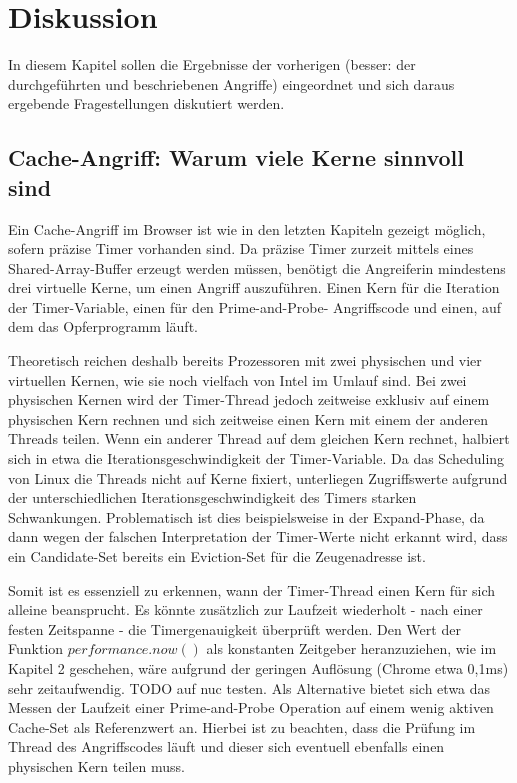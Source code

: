 \chapter{Diskussion}
\label{chapter:discussion}

In diesem Kapitel sollen die Ergebnisse der vorherigen (besser: der durchgeführten und beschriebenen Angriffe) eingeordnet und sich daraus ergebende Fragestellungen diskutiert werden.


\section{Cache-Angriff: Warum viele Kerne sinnvoll sind }

Ein Cache-Angriff im Browser ist wie in den letzten Kapiteln gezeigt möglich, sofern präzise Timer vorhanden sind. Da präzise Timer zurzeit mittels eines Shared-Array-Buffer erzeugt werden müssen, benötigt die Angreiferin mindestens drei virtuelle Kerne, um einen Angriff auszuführen. Einen Kern für die Iteration der Timer-Variable, einen für den Prime-and-Probe- Angriffscode und einen, auf dem das Opferprogramm läuft.

Theoretisch reichen deshalb bereits Prozessoren mit zwei physischen und vier virtuellen Kernen, wie sie noch vielfach von Intel im Umlauf sind. Bei zwei physischen Kernen wird der Timer-Thread jedoch zeitweise exklusiv auf einem physischen Kern rechnen und sich zeitweise einen Kern mit einem der anderen Threads teilen.
Wenn ein anderer Thread auf dem gleichen Kern rechnet, halbiert sich in etwa die Iterationsgeschwindigkeit der Timer-Variable.
Da das Scheduling von Linux die Threads nicht auf Kerne fixiert, unterliegen Zugriffswerte aufgrund der unterschiedlichen Iterationsgeschwindigkeit des Timers starken Schwankungen.
Problematisch ist dies beispielsweise in der Expand-Phase, da dann wegen der falschen Interpretation der Timer-Werte nicht erkannt wird, dass ein Candidate-Set bereits ein Eviction-Set für die Zeugenadresse ist.

Somit ist es essenziell zu erkennen, wann der Timer-Thread einen Kern für sich alleine beansprucht.
Es könnte zusätzlich zur Laufzeit wiederholt - nach einer festen Zeitspanne - die Timergenauigkeit überprüft werden.
Den Wert der Funktion $performance.now()$ als konstanten Zeitgeber heranzuziehen, wie im Kapitel 2 geschehen, wäre aufgrund der geringen Auflösung (Chrome etwa 0,1ms) sehr zeitaufwendig.
TODO auf nuc testen.
Als Alternative bietet sich etwa das Messen der Laufzeit einer Prime-and-Probe Operation auf einem wenig aktiven Cache-Set als Referenzwert an.
Hierbei ist zu beachten, dass die Prüfung im Thread des Angriffscodes läuft und dieser sich eventuell ebenfalls einen physischen Kern teilen muss.

